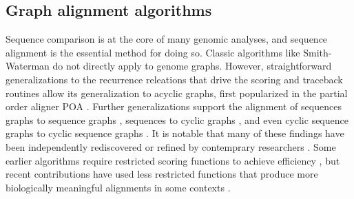 \subsection{Graph alignment algorithms}
\label{sec:graphalignment}

Sequence comparison is at the core of many genomic analyses, and sequence alignment is the essential method for doing so. 
Classic algorithms like Smith-Waterman \cite{Smith_1981} do not directly apply to genome graphs.
However, straightforward generalizations to the recurrence releations that drive the scoring and traceback routines allow its generalization to acyclic graphs, first popularized in the partial order aligner \textsc{POA} \cite{Lee_2002}.
Further generalizations support the alignment of sequences graphs to sequence graphs \cite{Grasso_2004}, sequences to cyclic graphs \cite{Navarro_2000}, and even cyclic sequence graphs to cyclic sequence graphs \cite{Myers_1989, Amir_1997}. %
It is notable that many of these findings have been independently rediscovered or refined by contemprary researchers \cite{Antipov_2015, Rautiainen_2017, Jain_2019a,kural2014methods}.
Some earlier algorithms require restricted scoring functions to achieve efficiency \cite{Rautiainen_2017}, but recent contributions have used less restricted functions that produce more biologically meaningful alignments in some contexts \cite{Jain_2019a}.







